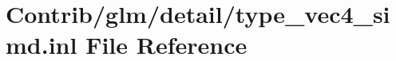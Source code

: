 \hypertarget{type__vec4__simd_8inl}{}\section{Contrib/glm/detail/type\+\_\+vec4\+\_\+simd.inl File Reference}
\label{type__vec4__simd_8inl}
